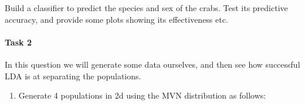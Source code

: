\documentclass[
]{book}
\newenvironment{Shaded}{\begin{snugshade}}{\end{snugshade}}
\newcommand{\AttributeTok}[1]{\textcolor[rgb]{0.13,0.29,0.53}{#1}}
\newcommand{\FunctionTok}[1]{\textcolor[rgb]{0.13,0.29,0.53}{\textbf{#1}}}
\newcommand{\NormalTok}[1]{#1}
\newcommand{\OtherTok}[1]{\textcolor[rgb]{0.56,0.35,0.01}{#1}}
\newcommand{\SpecialCharTok}[1]{\textcolor[rgb]{0.81,0.36,0.00}{\textbf{#1}}}
\newcommand{\StringTok}[1]{\textcolor[rgb]{0.31,0.60,0.02}{#1}}
\providecommand{\tightlist}{%
  \setlength{\itemsep}{0pt}\setlength{\parskip}{0pt}}
\theoremstyle{definition}
\theoremstyle{definition}
\theoremstyle{definition}
\theoremstyle{definition}
\theoremstyle{remark}
\begin{document}
\begin{Shaded}
\end{Shaded}

Build a classifier to predict the species and sex of the crabs. Test its predictive accuracy, and provide some plots showing its effectiveness etc.

\hypertarget{task-2-3}{%
\paragraph*{Task 2}\label{task-2-3}}

In this question we will generate some data ourselves, and then see how successful LDA is at separating the populations.

\begin{enumerate}
\def\labelenumi{\roman{enumi}.}
\tightlist
\item
  Generate 4 populations in 2d using the MVN distribution as follows:
\end{enumerate}
\end{document}
